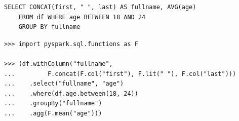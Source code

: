 \documentclass[aspectratio=169]{beamer}
\begin{document}




\begin{frame}[fragile]{}
\small
\begin{verbatim}
SELECT CONCAT(first, " ", last) AS fullname, AVG(age)
    FROM df WHERE age BETWEEN 18 AND 24
    GROUP BY fullname
\end{verbatim}

\begin{verbatim}
>>> import pyspark.sql.functions as F

>>> (df.withColumn("fullname",
...         F.concat(F.col("first"), F.lit(" "), F.col("last")))
...    .select("fullname", "age")
...    .where(df.age.between(18, 24))
...    .groupBy("fullname")
...    .agg(F.mean("age")))
\end{verbatim}

\end{frame}
\end{document}
